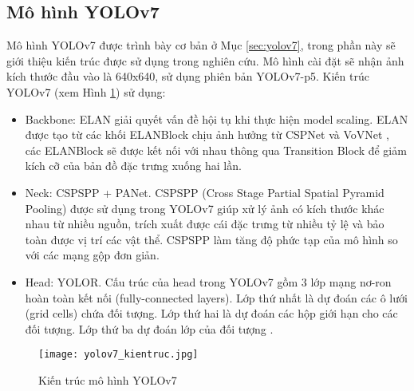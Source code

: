 \documentclass[../the.tex]{subfiles}
\begin{document}
\subsection{Mô hình YOLOv7}
{\fontsize{13}{12} \selectfont

	Mô hình YOLOv7 được trình bày cơ bản ở Mục \ref{sec:yolov7}, trong phần này sẽ giới thiệu kiến trúc được sử dụng trong nghiên cứu. Mô hình cài đặt sẽ nhận ảnh kích thước đầu vào là 640x640, sử dụng phiên bản YOLOv7-p5. Kiến trúc YOLOv7 (xem Hình \ref{fig:yolov7_kientruc}) sử dụng:
	\begin{itemize}
		\item Backbone: ELAN giải quyết vấn đề hội tụ khi thực hiện model scaling. ELAN được tạo từ các khối ELANBlock chịu ảnh hưởng từ CSPNet \cite{wang2019cspnet} và VoVNet \cite{lee2019energy}, các ELANBlock sẽ được kết nối với nhau thông qua Transition Block để giảm kích cỡ của bản đồ đặc trưng xuống hai lần.
		\item Neck: CSPSPP + PANet. CSPSPP (Cross Stage Partial Spatial Pyramid Pooling) được sử dụng trong YOLOv7 giúp xử lý ảnh có kích thước khác nhau từ nhiều nguồn, trích xuất được cái đặc trưng từ nhiều tỷ lệ và bảo toàn được vị trí các vật thể. CSPSPP làm tăng độ phức tạp của mô hình so với các mạng gộp đơn giản.
		\item Head: YOLOR. Cấu trúc của head trong YOLOv7
		      gồm 3 lớp mạng nơ-ron hoàn toàn kết nối
		      (fully-connected layers). Lớp thứ nhất
		      là dự đoán các ô lưới (grid cells) chứa đối
		      tượng. Lớp thứ hai là dự đoán các hộp giới hạn cho các đối tượng. Lớp thứ ba dự đoán lớp của đối tượng \cite{cachuayol7}.
	\end{itemize}

}

\begin{figure}[H]
	\centering
	\texttt{[image: yolov7\_kientruc.jpg]}
	\caption{Kiến trúc mô hình YOLOv7}
	\label{fig:yolov7_kientruc}
\end{figure}
\end{document}
